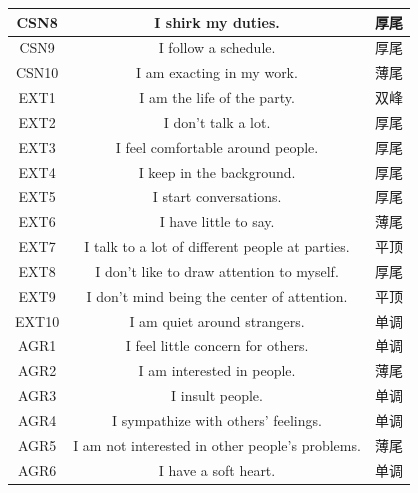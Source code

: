 \documentclass[UTF8]{ctexart}
\begin{document}
\begin{longtable}{c|c|c}
  CSN8         & I shirk my duties.                                       & 厚尾            \\\hline
  CSN9         & I follow a schedule.                                     & 厚尾            \\\hline
  CSN10        & I am exacting in my work.                                & 薄尾            \\\hline
  EXT1         & I am the life of the party.                              & 双峰            \\\hline
  EXT2         & I don't talk a lot.                                      & 厚尾            \\\hline
  EXT3         & I feel comfortable around people.                        & 厚尾            \\\hline
  EXT4         & I keep in the background.                                & 厚尾            \\\hline
  EXT5         & I start conversations.                                   & 厚尾            \\\hline
  EXT6         & I have little to say.                                    & 薄尾            \\\hline
  EXT7         & I talk to a lot of different people at parties.          & 平顶            \\\hline
  EXT8         & I don't like to draw attention to myself.                & 厚尾            \\\hline
  EXT9         & I don't mind being the center of attention.              & 平顶            \\\hline
  EXT10        & I am quiet around strangers.                             & 单调            \\\hline
  AGR1         & I feel little concern for others.                        & 单调            \\\hline
  AGR2         & I am interested in people.                               & 薄尾            \\\hline
  AGR3         & I insult people.                                         & 单调            \\\hline
  AGR4         & I sympathize with others' feelings.                      & 单调            \\\hline
  AGR5         & I am not interested in other people's problems.          & 薄尾            \\\hline
  AGR6         & I have a soft heart.                                     & 单调            \\\hline

\end{longtable}
\end{document}
